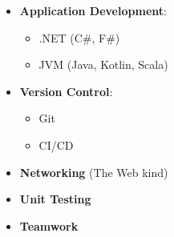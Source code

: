 \documentclass[11pt, twoside, a4paper]{article}
\newlength{\cvSideWidth}
\begin{document}
\begin{minipage}[t]{\cvSideWidth}
\begin{center}
\begin{flushleft}
\begin{itemize}
                \item \textbf{Application Development}:
                \begin{itemize}
                    \item .NET (C\#, F\#)
                    \item JVM (Java, Kotlin, Scala)
                \end{itemize}

                \item \textbf{Version Control}:
                \begin{itemize}
                    \item Git
                    \item CI/CD
                \end{itemize}

                \item \textbf{Networking} (The Web kind)
                \item \textbf{Unit Testing}
                \item \textbf{Teamwork}
            \end{itemize}
        \end{flushleft}


    \end{center}
\end{minipage}
\hspace*{1.5cm} %
\end{document}
